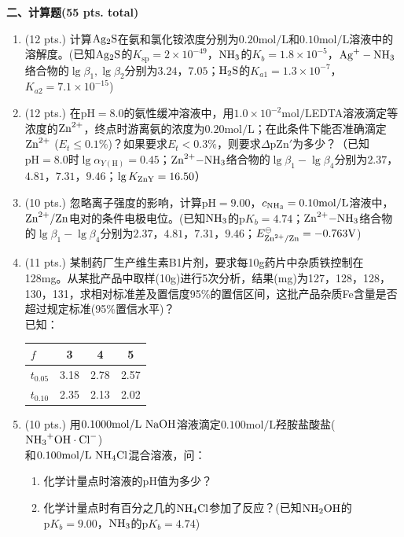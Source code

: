 \vspace{0.5cm}
\noindent\textbf{二、计算题(55 pts. total)}

\begin{enumerate}[label=\arabic*., itemsep=1.5ex]
    \item (12 pts.) 计算$\ce{Ag2S}$在氨和氯化铵浓度分别为$0.20\mathrm{mol/L}$和$0.10\mathrm{mol/L}$溶液中的溶解度。(已知$\ce{Ag2S}$的$K_{\mathrm{sp}}=2\times10^{-49}$，$\ce{NH3}$的$K_b=1.8\times10^{-5}$，$\ce{Ag^+ - NH3}$络合物的$\lg\beta_1,\lg\beta_2$分别为$3.24$，$7.05$；$\ce{H2S}$的$K_{a1}=1.3\times10^{-7}$，$K_{a2}=7.1\times10^{-15}$)
    \item (12 pts.) 在$\mathrm{pH}=8.0$的氨性缓冲溶液中，用$1.0\times10^{-2}\mathrm{mol/L}$EDTA溶液滴定等浓度的$\ce{Zn^{2+}}$，终点时游离氨的浓度为$0.20\mathrm{mol/L}$；在此条件下能否准确滴定$\ce{Zn^{2+}}$ ($E_t \leq 0.1\%$)？如果要求$E_t<0.3\%$，则要求$\Delta\mathrm{pZn}'$为多少？（已知$\mathrm{pH}=8.0$时$\lg\alpha_{Y(\mathrm{H})}=0.45$；$\ce{Zn^{2+}-NH3}$络合物的$\lg\beta_1-\lg\beta_4$分别为$2.37$，$4.81$，$7.31$，$9.46$；$\lg K_{\ce{ZnY}}=16.50$）
    \item (10 pts.) 忽略离子强度的影响，计算$\mathrm{pH}=9.00$，$c_{\ce{NH3}}=0.10\mathrm{mol/L}$溶液中，$\ce{Zn^{2+}/Zn}$电对的条件电极电位。(已知$\ce{NH3}$的$\mathrm{p}K_b=4.74$；$\ce{Zn^{2+}-NH3}$络合物的$\lg\beta_1-\lg\beta_4$分别为$2.37$，$4.81$，$7.31$，$9.46$；$E^\ominus_{\ce{Zn^{2+}/Zn}}=-0.763\mathrm{V}$)
    \item (11 pts.) 某制药厂生产维生素B1片剂，要求每10g药片中杂质铁控制在128mg。从某批产品中取样(10g)进行5次分析，结果(mg)为127，128，128，130，131，求相对标准差及置信度95\%的置信区间，这批产品杂质Fe含量是否超过规定标准(95\%置信水平)？
    \\
    已知：
    \begin{center}
    \begin{tabular}{l|ccc}
    $f$ & 3 & 4 & 5 \\
    \hline
    $t_{0.05}$ & 3.18 & 2.78 & 2.57 \\
    $t_{0.10}$ & 2.35 & 2.13 & 2.02 \\
    \end{tabular}
    \end{center}
    \item (10 pts.) 用$0.1000\mathrm{mol/L}\ \ce{NaOH}$溶液滴定$0.100\mathrm{mol/L}$羟胺盐酸盐($\ce{NH3^+OH\cdot Cl^-}$)
    \\
    和$0.100\mathrm{mol/L}\ \ce{NH4Cl}$混合溶液，问：
    \begin{enumerate}[label=(\arabic*), noitemsep, topsep=0pt, partopsep=0pt]
        \item 化学计量点时溶液的pH值为多少？
        \item 化学计量点时有百分之几的$\ce{NH4Cl}$参加了反应？(已知$\ce{NH2OH}$的$\mathrm{p}K_b=9.00$，$\ce{NH3}$的$\mathrm{p}K_b=4.74$)
    \end{enumerate}
\end{enumerate}